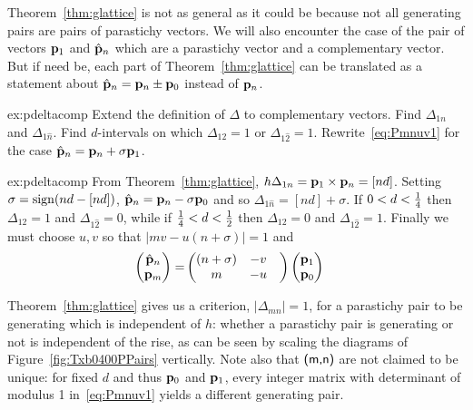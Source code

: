 Theorem~\ref{thm:glattice} is not as general as it could be because not all generating pairs are pairs of parastichy vectors. We will also encounter the case of the pair of vectors 
${\mathbf p}_{1}$ and $\hat{\mathbf p}_{n}$ which are a parastichy vector and a complementary vector. But if need be, each part of Theorem~\ref{thm:glattice} can be translated as a statement about $\hat{\mathbf p}_{n}={\mathbf p}_{n}\pm{\mathbf p}_{0}$ instead of ${\mathbf p}_{n}$. 

\begin{jExercise}{ex:pdeltacomp}
Extend the definition of $\Delta$ to complementary vectors. 	Find   $\Delta_{1n}$ and $\Delta_{1\hat n}$. Find  $d$-intervals on which 
$\Delta_{12}=1$ or $\Delta_{1\hat 2}=1$. Rewrite~\eqref{eq:Pmnuv1} for the case $\hat{\mathbf p}_{n}={\mathbf p}_{n}+\sigma{\mathbf p}_{1}$.
\label{ex:calcdelta}
\end{jExercise}
\begin{jAnswer}{ex:pdeltacomp}
From Theorem~\ref{thm:glattice}, $h\Delta_{1n}={\mathbf p}_{1}\times{\mathbf p}_{n}=[nd]$.
Setting $\sigma=\mathrm{sign} (nd -[nd])$, $\hat{\mathbf p}_{n}={\mathbf p}_{n}-\sigma{\mathbf p}_{0}$ and so $\Delta_{1\hat n}=[nd]+\sigma$. 
If $0<d<\textstyle{\frac{1}{4}}$ then $\Delta_{12}=1$ and $\Delta_{1\hat2}=0$, while 
if  $\textstyle{\frac{1}{4}}<d<\textstyle{\frac{1}{2}}$ then  $\Delta_{12}=0$ and $\Delta_{1\hat2}=1$.
Finally we must choose $u,v$ so that $|mv -u(n+\sigma)|=1$ and
		\begin{align}\label{eq:Pmnuv1ex}
		\begin{pmatrix}
			\hat{\mathbf p}_{n} \\ {\mathbf p}_{m} 
		\end{pmatrix} = &
		\begin{pmatrix}
			(n+\sigma)  & - v 
			\\
			m &- u &
		\end{pmatrix}
		\begin{pmatrix}
			{\mathbf p}_{1}
			\\
			{\mathbf p}_{0}
		\end{pmatrix}
	\end{align}
\end{jAnswer}

Theorem~\ref{thm:glattice} gives us a criterion, $|\Delta_{mn}|=1$, for a parastichy pair to be generating which is independent of $h$: whether a parastichy pair is generating or not is independent of the rise, as can be seen by scaling the diagrams of Figure~\ref{fig:Txb0400PPairs} vertically.  Note also that $\textsf{(m,n)}$ are not claimed to be unique: for fixed $d$ and thus ${\mathbf p}_{0}$ and ${\mathbf p}_{1}$, every integer matrix with determinant of modulus 1 in~\eqref{eq:Pmnuv1} yields a different generating pair.


